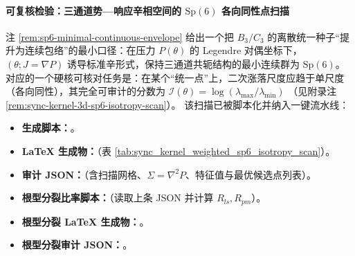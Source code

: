 \paragraph{可复核检验：三通道势—响应辛相空间的 \texorpdfstring{$\mathrm{Sp}(6)$}{Sp(6)} 各向同性点扫描}
注 \ref{rem:sp6-minimal-continuous-envelope} 给出一个把 \(B_3/C_3\) 的离散统一种子“提升为连续包络”的最小口径：在压力 \(P(\theta)\) 的 Legendre 对偶坐标下，
\((\theta;J=\nabla P)\) 诱导标准辛形式，保持三通道共轭结构的最小连续群为 \(\mathrm{Sp}(6)\)。
对应的一个硬核可核对任务是：在某个“统一点”上，二次涨落尺度应趋于单尺度（各向同性），其完全可审计的分数为
\(
\mathcal{I}(\theta)=\log(\lambda_{\max}/\lambda_{\min})
\)
（见附录注 \ref{rem:sync-kernel-3d-sp6-isotropy-scan}）。
该扫描已被脚本化并纳入一键流水线：
\begin{itemize}
  \item \textbf{生成脚本：}\texttt{}。
  \item \textbf{LaTeX 生成物：}\texttt{}（表 \ref{tab:sync_kernel_weighted_sp6_isotropy_scan}）。
  \item \textbf{审计 JSON：}\texttt{}（含扫描网格、\(\Sigma=\nabla^2P\)、特征值与最优候选点列表）。
  \item \textbf{根型分裂比率脚本：}\texttt{}（读取上条 JSON 并计算 \(R_{ls},R_{pm}\)）。
  \item \textbf{根型分裂 LaTeX 生成物：}\texttt{}。
  \item \textbf{根型分裂审计 JSON：}\texttt{}。
\end{itemize}

